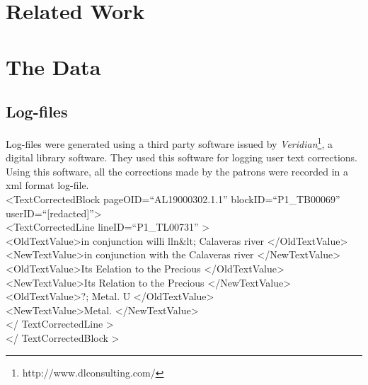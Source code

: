 \documentclass[letterpaper]{article}
\def\mydoubleq#1{``#1''}
\begin{document}
\section{Related Work}



\section{The Data}

\subsection{Log-files}
Log-files were generated using a third party software issued by \textit{Veridian}\footnote{http://www.dlconsulting.com/}, a digital library software. They used this software for logging user text corrections. Using this software, all the corrections made by the patrons were recorded in a xml format log-file. \\

\textless TextCorrectedBlock pageOID=\mydoubleq {AL19000302.1.1} blockID=\mydoubleq{P1\_TB00069} userID=\mydoubleq{[redacted]}\textgreater \\
\textless TextCorrectedLine lineID=\mydoubleq{P1\_TL00731} \textgreater \\
\textless OldTextValue\textgreater  in conjunction willi lln\&lt; Calaveras river \textless/OldTextValue\textgreater \\
\textless NewTextValue\textgreater  in conjunction with the Calaveras river \textless/NewTextValue\textgreater \\
\textless OldTextValue\textgreater  Its Eelation to the Precious \textless/OldTextValue\textgreater \\
\textless NewTextValue\textgreater  Its Relation to the Precious \textless/NewTextValue\textgreater \\
\textless OldTextValue\textgreater  ?; Metal. U \textless/OldTextValue\textgreater \\
\textless NewTextValue\textgreater  Metal. \textless/NewTextValue\textgreater \\
\textless / TextCorrectedLine \textgreater \\
\textless / TextCorrectedBlock \textgreater \\

\end{document}
